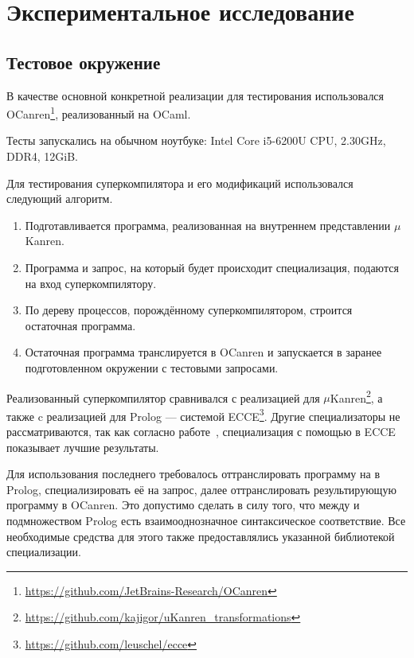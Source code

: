 \section{Экспериментальное исследование}
\label{sec:testing}

\subsection{Тестовое окружение}

В качестве основной конкретной реализации \ukanren для тестирования
использовался OCanren\footnote{\url{https://github.com/JetBrains-Research/OCanren}}\cite{ocanren},
реализованный на OCaml\cite{ocanren}.

Тесты запускались на обычном ноутбуке: Intel Core i5-6200U CPU, 2.30GHz, DDR4, 12GiB.

Для тестирования суперкомпилятора и его модификаций использовался следующий алгоритм.
\begin{enumerate}
\item Подготавливается программа, реализованная на внутреннем представлении $\mu$Kanren.
\item Программа и запрос, на который будет происходит специализация, подаются на вход суперкомпилятору.
\item По дереву процессов, порождённому суперкомпилятором, строится остаточная программа.
\item Остаточная программа транслируется в OCanren и
      запускается в заранее подготовленном окружении с тестовыми запросами.
\end{enumerate}


Реализованный суперкомпилятор сравнивался с реализацией \forcpd для $\mu$Kanren\footnote{\url{https://github.com/kajigor/uKanren_transformations}},
а также c реализацией \forcpd для Prolog --- системой ECCE\footnote{\url{https://github.com/leuschel/ecce}}.
Другие специализаторы не рассматриваются, так как согласно работе~\cite{controlPoly}, специализация с
помощью \forcpd в ECCE показывает лучшие результаты.

Для использования последнего требовалось оттранслировать программу на \ukanren в Prolog, специализировать
её на запрос, далее оттранслировать результирующую программу в OCanren.
Это допустимо сделать в силу того, что между \ukanren и подмножеством Prolog есть
взаимооднозначное синтаксическое соответствие. 
Все необходимые средства для этого также предоставлялись указанной библиотекой специализации.


